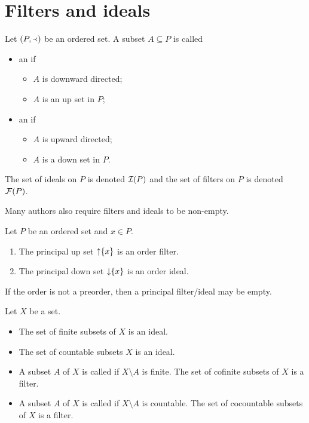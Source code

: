 \chapter{Filters and ideals}
\begin{definition}
Let $\sSet{P,\Yleft}$ be an ordered set. A subset $A\subseteq P$ is called
\begin{itemize}
\item an  if
\begin{itemize}
\item $A$ is downward directed;
\item $A$ is an up set in $P$;
\end{itemize}
\item an  if
\begin{itemize}
\item $A$ is upward directed;
\item $A$ is a down set in $P$.
\end{itemize}
\end{itemize}
The set of ideals on $P$ is denoted $\operatorname{\mathcal{I}}(P)$ and the set of filters on $P$ is denoted $\operatorname{\mathcal{F}}(P)$.
\end{definition}
Many authors also require filters and ideals to be non-empty.

\begin{lemma}
Let $P$ be an ordered set and $x\in P$.
\begin{enumerate}
\item The principal up set $\operatorname{\uparrow} \{x\}$ is an order filter.
\item The principal down set $\operatorname{\downarrow} \{x\}$ is an order ideal.
\end{enumerate}
\end{lemma}
If the order is not a preorder, then a principal filter/ideal may be empty.

\begin{example}
Let $X$ be a set.
\begin{itemize}
\item The set of finite subsets of $X$ is an ideal.
\item The set of countable subsets $X$ is an ideal.
\item A subset $A$ of $X$ is called  if $X\setminus A$ is finite. The set of cofinite subsets of $X$ is a filter.
\item A subset $A$ of $X$ is called  if $X\setminus A$ is countable. The set of cocountable subsets of $X$ is a filter.
\end{itemize}
\end{example}

